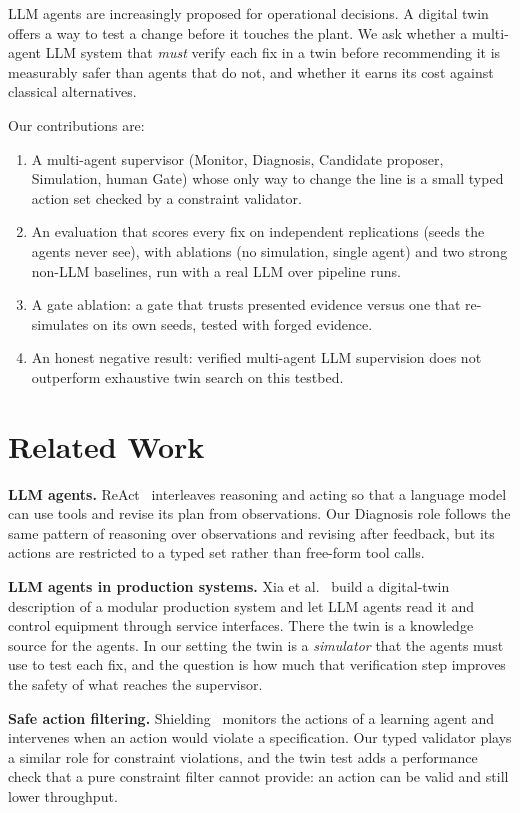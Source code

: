 \documentclass[conference]{IEEEtran}
\begin{document}
LLM agents are increasingly proposed for operational decisions. A digital
twin~\cite{grieves2017} offers a way to test a change before it touches the plant. We ask whether a
multi-agent LLM system that \emph{must} verify each fix in a twin before recommending it is measurably safer
than agents that do not, and whether it earns its cost against classical alternatives.

Our contributions are:
\begin{enumerate}
  \item A multi-agent supervisor (Monitor, Diagnosis, Candidate proposer, Simulation, human Gate) whose only
        way to change the line is a small typed action set checked by a constraint validator.
  \item An evaluation that scores every fix on independent replications (seeds the agents never see),
        with ablations (no simulation, single agent) and two strong non-LLM baselines, run with a real LLM
        over \NRuns{} pipeline runs.
  \item A gate ablation: a gate that trusts presented evidence versus one that re-simulates on its own
        seeds, tested with forged evidence.
  \item An honest negative result: verified multi-agent LLM supervision does not outperform exhaustive twin
        search on this testbed.
\end{enumerate}

\section{Related Work}
\textbf{LLM agents.} ReAct~\cite{yao2023react} interleaves reasoning and acting so that a language model can
use tools and revise its plan from observations. Our Diagnosis role follows the same pattern of reasoning
over observations and revising after feedback, but its actions are restricted to a typed set rather than
free-form tool calls.

\textbf{LLM agents in production systems.} Xia et al.~\cite{xia2023autonomous} build a digital-twin
description of a modular production system and let LLM agents read it and control equipment through service
interfaces. There the twin is a knowledge source for the agents. In our setting the twin is a
\emph{simulator} that the agents must use to test each fix, and the question is how much that verification
step improves the safety of what reaches the supervisor.

\textbf{Safe action filtering.} Shielding~\cite{alshiekh2018shield} monitors the actions of a learning agent
and intervenes when an action would violate a specification. Our typed validator plays a similar
role for constraint violations, and the twin test adds a performance check that a pure constraint filter
cannot provide: an action can be valid and still lower throughput.
\end{document}
